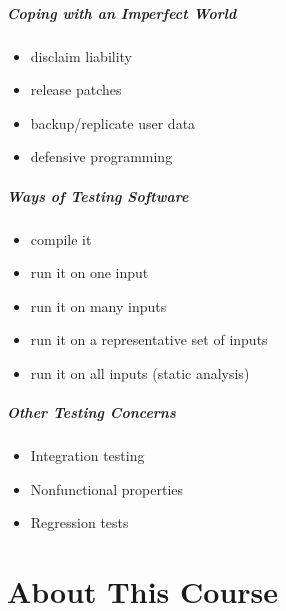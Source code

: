 \documentclass{beamer}
\newenvironment{changemargin}[1]{%
  \begin{list}{}{%
    \setlength{\topsep}{0pt}%
    \setlength{\leftmargin}{#1}%
    \setlength{\rightmargin}{1em}
    \setlength{\listparindent}{\parindent}%
    \setlength{\itemindent}{\parindent}%
    \setlength{\parsep}{\parskip}%
  }%
  \item[]}{\end{list}}
\begin{document}
\begin{frame}
  \frametitle{Coping with an Imperfect World}

  \Large
  \begin{changemargin}{2em}
  
  \begin{itemize}
   \item disclaim liability
   \item release patches
   \item backup/replicate user data
   \item defensive programming
  \end{itemize}
  \end{changemargin}
\end{frame}

\begin{frame}
  \frametitle{Ways of Testing Software}

  \Large
    \begin{changemargin}{2em}

  \begin{itemize}
   \item compile it
   \item<2-> run it on one input 
   \item<3-> run it on many inputs
   \item<4-> run it on a representative set of inputs
   \item<5-> run it on all inputs (static analysis)
  \end{itemize}
    \end{changemargin}

\end{frame}

\begin{frame}
  \frametitle{Other Testing Concerns}

  \begin{changemargin}{2em}
\Large
  \begin{itemize}
  \item Integration testing
  \item Nonfunctional properties
  \item Regression tests
  \end{itemize}
  \end{changemargin}
\end{frame}

\part{About This Course}
\begin{frame}
  \partpage
\end{frame}
\end{document}
